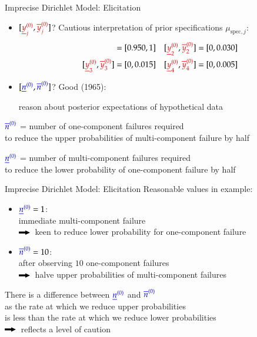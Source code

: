 \documentclass{beamer}
\def\then{{\color{lmugreen}$\rule[0.35ex]{2ex}{0.5ex}\!\!\!\blacktriangleright$}}
\def\rot#1{{\color{red}#1}}
\def\gruen#1{{\color{blue}#1}}
\def\yzjlr#1{\rot{\ul{y}\uz_#1}}
\def\yzjur#1{\rot{\ol{y}\uz_#1}}
\def\nzlg{\gruen{\nzl}}
\def\nzug{\gruen{\nzu}}
\begin{document}
\begin{frame}{Imprecise Dirichlet Model: Elicitation}
  \begin{itemize}
  \item   $[\yzjlr{j},\yzjur{j}]$? Cautious interpretation of prior specifications $\mu_{\text{spec},j}$:
  \begin{align*}
    [\yzjlr{1},\yzjur{1}]&=[0.950,1]
    &
    [\yzjlr{2},\yzjur{2}]&=[0,0.030]
    \\
    [\yzjlr{3},\yzjur{3}]&=[0,0.015]
    &
    [\yzjlr{4},\yzjur{4}]&=[0,0.005]
  \end{align*}
  \item  $[\nzlg,\nzug]$? Good (1965): \\ %
    \begin{center}
    reason about posterior expectations of hypothetical data
    \end{center}
  \end{itemize}
  \begin{alertblock}{}
    $\nzug$ = number of one-component failures required \\
    to reduce the upper probabilities of multi-component failure by half
  \end{alertblock}
  \begin{alertblock}{}
    $\nzlg$ = number of multi-component failures required \\
    to reduce the lower probability of one-component failure by half
  \end{alertblock}
\end{frame}

\begin{frame}{Imprecise Dirichlet Model: Elicitation}
  Reasonable values in example:
  \begin{itemize}
  \item
    $\nzlg=1$: \\
    immediate multi-component failure
    \\
    \then\ keen to reduce lower probability for one-component failure
  \item 
    $\nzug=10$: \\
    after observing $10$ one-component failures \\
    \then\ halve upper probabilities of multi-component failures
  \end{itemize}
  There is a \alert{difference between $\nzlg$ and $\nzug$} \\
  as the rate at which we reduce upper probabilities \\
  is less than the rate at which we reduce lower probabilities \\
  \then\ reflects a \alert{level of caution}
\end{frame}
\end{document}
